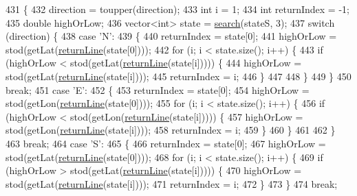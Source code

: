 \begin{DoxyCode}
431                                                             \{
432     direction = toupper(direction);
433     \textcolor{keywordtype}{int} i = 1;
434     \textcolor{keywordtype}{int} returnIndex = -1;
435     \textcolor{keywordtype}{double} highOrLow;
436     vector<int> state = \hyperlink{classSSClass_a9df3598c000a6a5e9ef994d19196e69f}{search}(stateS, 3);
437     \textcolor{keywordflow}{switch} (direction) \{
438     \textcolor{keywordflow}{case} \textcolor{charliteral}{'N'}:
439     \{
440         returnIndex = state[0];
441         highOrLow = stod(getLat(\hyperlink{classSSClass_ab0a8ea1af895df28359b5733bd920ef3}{returnLine}(state[0])));
442         \textcolor{keywordflow}{for} (i; i < state.size(); i++) \{
443             \textcolor{keywordflow}{if} (highOrLow < stod(getLat(\hyperlink{classSSClass_ab0a8ea1af895df28359b5733bd920ef3}{returnLine}(state[i])))) \{
444                 highOrLow = stod(getLat(\hyperlink{classSSClass_ab0a8ea1af895df28359b5733bd920ef3}{returnLine}(state[i])));
445                 returnIndex = i;
446             \}
447 
448         \}
449     \}
450     \textcolor{keywordflow}{break};
451     \textcolor{keywordflow}{case} \textcolor{charliteral}{'E'}:
452     \{
453         returnIndex = state[0];
454         highOrLow = stod(getLon(\hyperlink{classSSClass_ab0a8ea1af895df28359b5733bd920ef3}{returnLine}(state[0])));
455         \textcolor{keywordflow}{for} (i; i < state.size(); i++) \{
456             \textcolor{keywordflow}{if} (highOrLow < stod(getLon(\hyperlink{classSSClass_ab0a8ea1af895df28359b5733bd920ef3}{returnLine}(state[i])))) \{
457                 highOrLow = stod(getLon(\hyperlink{classSSClass_ab0a8ea1af895df28359b5733bd920ef3}{returnLine}(state[i])));
458                 returnIndex = i;
459             \}
460         \}
461         
462     \}
463     \textcolor{keywordflow}{break};
464     \textcolor{keywordflow}{case} \textcolor{charliteral}{'S'}:
465     \{
466         returnIndex = state[0];
467         highOrLow = stod(getLat(\hyperlink{classSSClass_ab0a8ea1af895df28359b5733bd920ef3}{returnLine}(state[0])));
468         \textcolor{keywordflow}{for} (i; i < state.size(); i++) \{
469             \textcolor{keywordflow}{if} (highOrLow > stod(getLat(\hyperlink{classSSClass_ab0a8ea1af895df28359b5733bd920ef3}{returnLine}(state[i])))) \{
470                 highOrLow = stod(getLat(\hyperlink{classSSClass_ab0a8ea1af895df28359b5733bd920ef3}{returnLine}(state[i])));
471                 returnIndex = i;
472             \}
473         \}
474         \textcolor{keywordflow}{break};

\end{DoxyCode}
